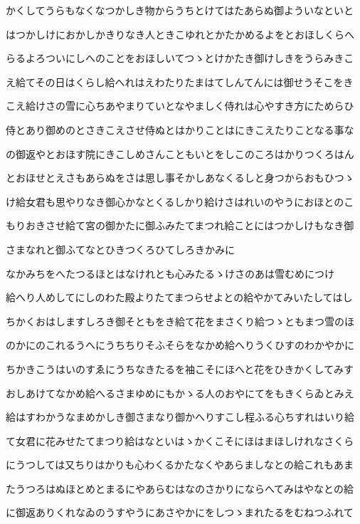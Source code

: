 \documentclass[a4paper,11pt,landscape]{ltjtarticle}
\begin{document}
かくしてうらもなくなつかしき物からうちとけてはたあらぬ御よういなといと
\par\medskip
はつかしけにおかしかきりなき人ときこゆれとかたかめるよをとおほしくらへ
\par\medskip
らるよろついにしへのことをおほしいてつゝとけかたき御けしきをうらみきこ
\par\medskip
え給てその日はくらし給へれはえわたりたまはてしんてんには御せうそこをき
\par\medskip
こえ給けさの雪に心ちあやまりていとなやましく侍れは心やすき方にためらひ
\par\medskip
侍とあり御めのとさきこえさせ侍ぬとはかりことはにきこえたりことなる事な
\par\medskip
の御返やとおほす院にきこしめさんこともいとをしこのころはかりつくろはん
\par\medskip
とおほせとえさもあらぬをさは思し事そかしあなくるしと身つからおもひつゝ
\par\medskip
け給女君も思やりなき御心かなとくるしかり給けさはれいのやうにおほとのこ
\par\medskip
もりおきさせ給て宮の御かたに御ふみたてまつれ給ことにはつかしけもなき御
\par\medskip
さまなれと御ふてなとひきつくろひてしろきかみに
\par\medskip
なかみちをへたつるほとはなけれとも心みたるゝけさのあは雪むめにつけ
\par\medskip
給へり人めしてにしのわた殿よりたてまつらせよとの給やかてみいたしてはし
\par\medskip
ちかくおはしますしろき御そともをき給て花をまさくり給つゝともまつ雪のほ
\par\medskip
のかにのこれるうへにうちちりそふそらをなかめ給へりうくひすのわかやかに
\par\medskip
ちかきこうはいのすゑにうちなきたるを袖こそにほへと花をひきかくしてみす
\par\medskip
おしあけてなかめ給へるさまゆめにもかゝる人のおやにてをもきくらゐとみえ
\par\medskip
給はすわかうなまめかしき御さまなり御かへりすこし程ふる心ちすれはいり給
\par\medskip
て女君に花みせたてまつり給はなといはゝかくこそにほはまほしけれなさくら
\par\medskip
にうつしては又ちりはかりも心わくるかたなくやあらましなとの給これもあま
\par\medskip
たうつろはぬほとめとまるにやあらむはなのさかりにならへてみはやなとの給
\par\medskip
に御返ありくれなゐのうすやうにあさやかにをしつゝまれたるをむねつふれて
\end{document}
